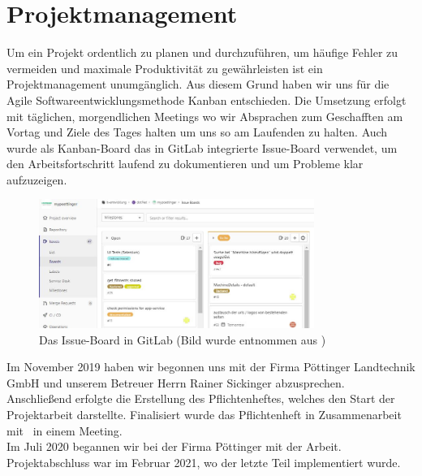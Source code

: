 \chapter{Projektmanagement}
Um ein Projekt ordentlich zu planen und durchzuführen, um häufige Fehler zu vermeiden und maximale Produktivität zu gewährleisten ist ein Projektmanagement unumgänglich. Aus diesem Grund haben wir uns für die Agile Softwareentwicklungsmethode Kanban entschieden. Die Umsetzung erfolgt mit täglichen, morgendlichen Meetings wo wir Absprachen zum Geschafften am Vortag und Ziele des Tages halten um uns so am Laufenden zu halten. Auch wurde als Kanban-Board das in GitLab integrierte Issue-Board verwendet, um den Arbeitsfortschritt laufend zu dokumentieren und um Probleme klar aufzuzeigen.\\

\begin{figure}[h]
	\centerline{
		\includegraphics[width=0.8\textwidth]{./grafiken/GitLab_issue_Board.JPG}
	}
	\vskip0pt
	\caption{Das Issue-Board in GitLab (Bild wurde entnommen aus \cite{gitlabIssueBoard})}
\end{figure}


Im November 2019 haben wir begonnen uns mit der Firma Pöttinger Landtechnik GmbH und unserem Betreuer Herrn Rainer Sickinger abzusprechen.\\
Anschließend erfolgte die Erstellung des Pflichtenheftes, welches den Start der Projektarbeit darstellte. Finalisiert wurde das Pflichtenheft in Zusammenarbeit mit \ThPartnerPersonName \ in einem Meeting.\\
Im Juli 2020 begannen wir bei der Firma Pöttinger mit der Arbeit. Projektabschluss war im Februar 2021, wo der letzte Teil implementiert wurde.

